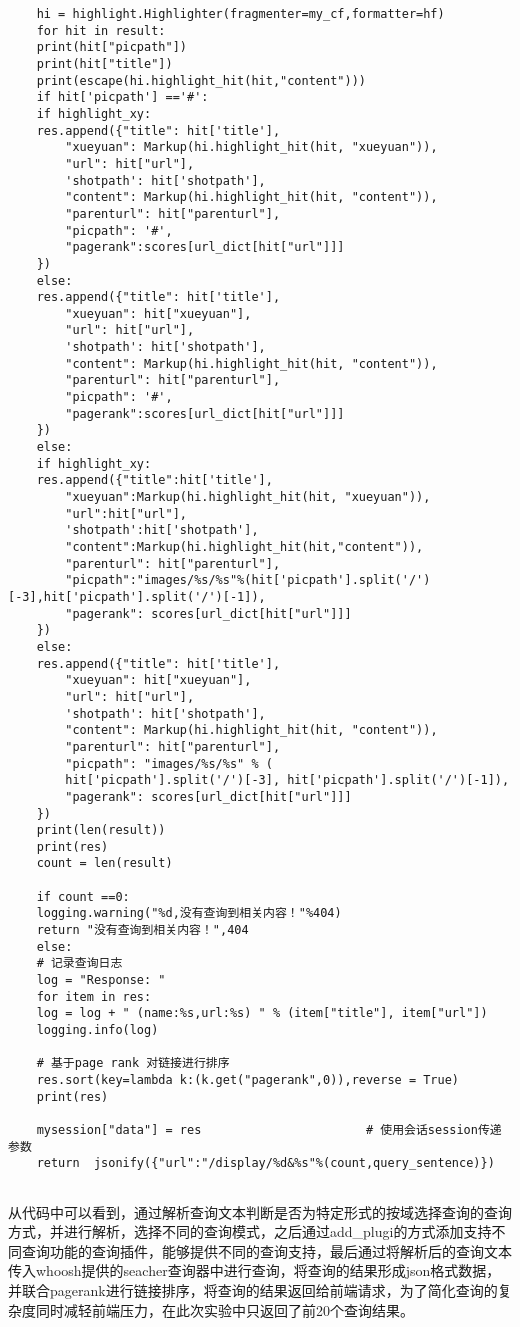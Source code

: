 \documentclass[lang=cn,11pt]{elegantpaper}
\begin{document}
\begin{lstlisting}
	hi = highlight.Highlighter(fragmenter=my_cf,formatter=hf)
	for hit in result:
	print(hit["picpath"])
	print(hit["title"])
	print(escape(hi.highlight_hit(hit,"content")))
	if hit['picpath'] =='#':
	if highlight_xy:
	res.append({"title": hit['title'],
		"xueyuan": Markup(hi.highlight_hit(hit, "xueyuan")),
		"url": hit["url"],
		'shotpath': hit['shotpath'],
		"content": Markup(hi.highlight_hit(hit, "content")),
		"parenturl": hit["parenturl"],
		"picpath": '#',
		"pagerank":scores[url_dict[hit["url"]]]
	})
	else:
	res.append({"title": hit['title'],
		"xueyuan": hit["xueyuan"],
		"url": hit["url"],
		'shotpath': hit['shotpath'],
		"content": Markup(hi.highlight_hit(hit, "content")),
		"parenturl": hit["parenturl"],
		"picpath": '#',
		"pagerank":scores[url_dict[hit["url"]]]
	})
	else:
	if highlight_xy:
	res.append({"title":hit['title'],
		"xueyuan":Markup(hi.highlight_hit(hit, "xueyuan")),
		"url":hit["url"],
		'shotpath':hit['shotpath'],
		"content":Markup(hi.highlight_hit(hit,"content")),
		"parenturl": hit["parenturl"],
		"picpath":"images/%s/%s"%(hit['picpath'].split('/')[-3],hit['picpath'].split('/')[-1]),
		"pagerank": scores[url_dict[hit["url"]]]
	})
	else:
	res.append({"title": hit['title'],
		"xueyuan": hit["xueyuan"],
		"url": hit["url"],
		'shotpath': hit['shotpath'],
		"content": Markup(hi.highlight_hit(hit, "content")),
		"parenturl": hit["parenturl"],
		"picpath": "images/%s/%s" % (
		hit['picpath'].split('/')[-3], hit['picpath'].split('/')[-1]),
		"pagerank": scores[url_dict[hit["url"]]]
	})
	print(len(result))
	print(res)
	count = len(result)
	
	if count ==0:
	logging.warning("%d,没有查询到相关内容！"%404)
	return "没有查询到相关内容！",404
	else:
	# 记录查询日志
	log = "Response: "
	for item in res:
	log = log + " (name:%s,url:%s) " % (item["title"], item["url"])
	logging.info(log)
	
	# 基于page rank 对链接进行排序
	res.sort(key=lambda k:(k.get("pagerank",0)),reverse = True)
	print(res)
	
	mysession["data"] = res                       # 使用会话session传递参数
	return  jsonify({"url":"/display/%d&%s"%(count,query_sentence)})
		
\end{lstlisting}

从代码中可以看到，通过解析查询文本判断是否为特定形式的按域选择查询的查询方式，并进行解析，选择不同的查询模式，之后通过add\_plugi的方式添加支持不同查询功能的查询插件，能够提供不同的查询支持，最后通过将解析后的查询文本传入whoosh提供的seacher查询器中进行查询，将查询的结果形成json格式数据，并联合pagerank进行链接排序，将查询的结果返回给前端请求，为了简化查询的复杂度同时减轻前端压力，在此次实验中只返回了前20个查询结果。
\end{document}
